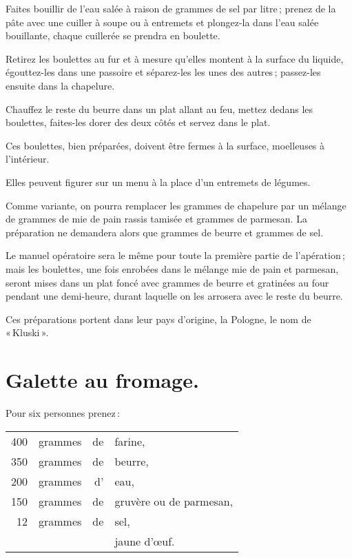 Faites bouillir de l'eau salée à raison de {\mmm} grammes de sel par
litre ; prenez de la pâte avec une cuiller à soupe ou à entremets et plongez-la
dans l'eau salée bouillante, chaque cuillerée se prendra en boulette.

Retirez les boulettes au fur et à mesure qu'elles montent à la surface du
liquide, égouttez-les dans une passoire et séparez-les les unes des autres ;
passez-les ensuite dans la chapelure.

Chauffez le reste du beurre dans un plat allant au feu, mettez dedans les
boulettes, faites-les dorer des deux côtés et servez dans le plat.

Ces boulettes, bien préparées, doivent être fermes à la surface, moelleuses à
l'intérieur.

Elles peuvent figurer sur un menu à la place d'un entremets de légumes.

\sk

Comme variante, on pourra remplacer les {\mmm} grammes de chapelure par
un mélange de {\mmm} grammes de mie de pain rassis tamisée et
{\mmm} grammes de parmesan. La préparation ne demandera alors que
{\mmm} grammes de beurre et {\mmm} grammes de sel.

Le manuel opératoire sera le même pour toute la première partie de
l'apération ; mais les boulettes, une fois enrobées dans le mélange mie de pain
et parmesan, seront mises dans un plat foncé avec {\mmm} grammes de
beurre et gratinées au four pendant une demi-heure, durant laquelle on les
arrosera avec le reste du beurre.

\medskip

Ces préparations portent dans leur pays d'origine, la Pologne, le nom de
« Kluski ».

\section*{\centering Galette au fromage.}
{}

Pour six personnes prenez :

\footnotesize
\begin{longtable}{rrrp{16em}}
    400 & grammes & de & farine,                                                                          \\
    350 & grammes & de & beurre,                                                                          \\
    200 & grammes & d' & eau,                                                                             \\
    150 & grammes & de & gruvère ou de parmesan,                                                          \\
     12 & grammes & de & sel,                                                                             \\
        &         &    & jaune d'œuf.                                                                     \\
\end{longtable}
\normalsize

